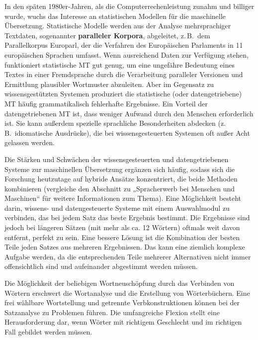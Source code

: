 \documentclass[]{../../metanetpaper}
\begin{document}
\begin{multicols}{2}
In den späten 1980er-Jahren, als die Computerrechenleistung zunahm und billiger wurde, wuchs das Interesse an statistischen Modellen für die maschinelle Übersetzung. Statistische Modelle werden aus der Analyse mehrsprachiger Textdaten, sogenannter \textbf{paralleler Korpora}, abgeleitet, z.\,B.~dem Parallelkorpus Europarl, der die Verfahren des Europäischen Parlaments in 11 europäischen Sprachen umfasst. Wenn ausreichend Daten zur Verfügung stehen, funktioniert statistische MT gut genug, um eine ungefähre Bedeutung eines Textes in einer Fremdsprache durch die Verarbeitung paralleler Versionen und Ermittlung plausibler Wortmuster abzuleiten. Aber im Gegensatz zu wissensgestützten Systemen produziert die statistische (oder datengetriebene) MT häufig grammatikalisch fehlerhafte Ergebnisse. Ein Vorteil der datengetriebenen MT ist, dass weniger Aufwand durch den Menschen erforderlich ist. Sie kann außerdem spezielle sprachliche Besonderheiten abdecken (z.\,B.~idiomatische Ausdrücke), die bei wissensgesteuerten Systemen oft außer Acht gelassen werden. 

Die Stärken und Schwächen der wissensgesteuerten und datengetriebenen Systeme zur maschinellen Übersetzung ergänzen sich häufig, sodass sich die Forschung heutzutage auf hybride Ansätze konzentriert, die beide Methoden kombinieren (vergleiche den Abschnitt zu „Spracherwerb bei Menschen und Maschinen“ für weitere Informationen zum Thema). Eine Möglichkeit besteht darin, wissens- und datengesteuerte Systeme mit einem Auswahlmodul zu verbinden, das bei jedem Satz das beste Ergebnis bestimmt. Die Ergebnisse sind jedoch bei längeren Sätzen (mit mehr als ca. 12 Wörtern) oftmals weit davon entfernt, perfekt zu sein. Eine bessere Lösung ist die Kombination der besten Teile jeden Satzes aus mehreren Ergebnissen. Das kann eine ziemlich komplexe Aufgabe werden, da die entsprechenden Teile mehrerer Alternativen nicht immer offensichtlich sind und aufeinander abgestimmt werden müssen. 


Die Möglichkeit der beliebigen Wortneuschöpfung durch das Verbinden von Wörtern erschwert die Wortanalyse und die Erstellung von Wörterbüchern. Eine frei wählbare Wortstellung und getrennte Verbkonstruktionen können bei der Satzanalyse zu Problemen führen. Die umfangreiche Flexion stellt eine Herausforderung dar, wenn Wörter mit richtigem Geschlecht und im richtigen Fall gebildet werden müssen. 


\end{multicols}
\end{document}

